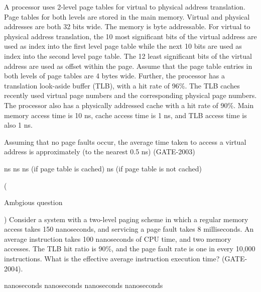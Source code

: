 
\begin{questyle}

  \question  A processor uses 2-level page tables for virtual to physical address translation. Page tables for
             both levels are stored in the main memory. Virtual and physical addresses are both 32 bits wide.
             The memory is byte addressable. For virtual to physical address translation, the 10 most significant
             bits of the virtual address are used as index into the first level page table while the next 10 bits
             are used as index into the second level page table. The 12 least significant bits of the virtual
             address are used as offset within the page. Assume that the page table entries in both levels of
             page tables are 4 bytes wide. Further, the processor has a translation look-aside buffer (TLB), with a
             hit rate of 96\%. The TLB caches recently used virtual page numbers and the corresponding physical
             page numbers. The processor also has a physically addressed cache with a hit rate of 90\%.
             Main memory access time is 10 ns, cache access time is 1 ns, and TLB access time is also 1 ns.

            Assuming that no page faults occur, the average time taken to access a virtual address is
            approximately (to the nearest 0.5 ns) (GATE-2003)

            \begin{choices}
               ns
               ns
               ns  (if page table is cached)
               ns  (if page table is not cached)
            \end{choices}

\end{questyle}


\begin{questyle}

  \question ( \begin{hl}[red]{Ambgious question} \end{hl} )
             Consider  a system with a two-level paging scheme in which a regular memory access takes 150
             nanoseconds, and servicing a page fault takes 8 milliseconds. An average instruction takes
             100 nanoseconds of CPU time, and two memory accesses. The TLB hit ratio is 90\%, and the
             page fault rate is one in every 10,000 instructions. What is the effective average
             instruction execution time? (GATE-2004).

  \begin{choices}
     nanoseconds
     nanoseconds
     nanoseconds
     nanoseconds
  \end{choices}

\end{questyle}

